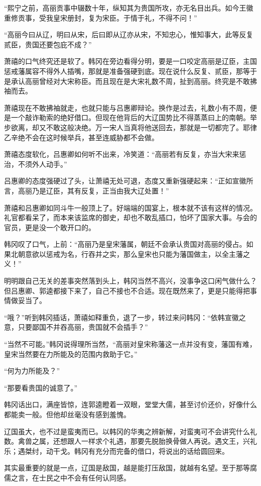 “熙宁之前，高丽贡事中辍数十年，纵知其为贵国所攻，亦无名目出兵。如今王徽重修贡事，受我皇宋册封，复为宋臣。于情于礼，不得不问！”

“高丽今曰从辽，明曰从宋，后曰即从辽亦从宋，不知忠心，惟知事大，此等反复贰臣，贵国还要包庇不成？”

萧禧的口气终究还是软了。韩冈在旁边看得分明，要是一口咬定高丽是辽臣，主国惩戒藩属容不得外人插嘴，那就是准备强硬到底。现在说什么反复、贰臣，那等于是承认高丽曾经对大宋称臣。而且现在是大宋礼数不周，扯到高丽。终究是不敢拂袖而去。

萧禧现在不敢拂袖就走，也就只能与吕惠卿辩论。换作是过去，礼数小有不周，便是一个敲诈勒索的绝好借口。但现在他背后的大辽国势比不得蒸蒸曰上的南朝。举步欲离，却又不敢这般决绝。万一宋人当真将他送回去，那就是一切都完了。耶律乙辛绝不会在这时候举兵，甚至连威胁都不会做。

萧禧态度软化，吕惠卿如何听不出来，冷笑道：“高丽若有反复，亦当大宋来惩治，不须外人动手。”

吕惠卿的态度强硬过了头，让萧禧无处可退，态度又重新强硬起来：“正如宣徽所言，高丽乃是辽臣，其有反复，正当由我大辽处置！”

萧禧和吕惠卿如同斗牛一般顶上了。好端端的国宴上，根本就不该有这样的情况。礼官都看呆了，而本来该监席的御史，却也不敢乱插口，怕坏了国家大事。与会的官员，更是没一个敢开口的。

韩冈叹了口气，上前：“高丽乃是皇宋藩属，朝廷不会承认贵国对高丽的侵占。如果北朝意欲以惩戒为名，行吞并之实，那么皇宋也只能为藩国做主，以全主藩之义！”

明明跟自己无关的差事突然落到头上，韩冈当然不高兴，没事争这口闲气做什么？但吕惠卿、郭逵都接下来了，自己不接也不合适。现在既然来了，更是只能得把事情做妥当了。

“哦？”听到韩冈插话，萧禧如释重负，退了一步，转过来问韩冈：“依韩宣徽之意，只要鄙国不并吞高丽，贵国就不会插手？”

“当然不可能。”韩冈说得理所当然，“高丽对皇宋称藩这一点并没有变，藩国有难，皇宋当然要在力所能及的范围内救助于它。”

“何为力所能及？”

“那要看贵国的诚意了。”

韩冈话出口，满座皆惊，连郭逵瞪着一双眼，堂堂大儒，甚至讨价还价，好像什么都能卖一般。但他却丝毫没有感到羞愧。

辽国虽大，也不过是蛮夷而已。以韩冈的华夷之辨新解，对蛮夷可不会讲究什么礼数。禽兽之属，还想跟人一样求个礼遇，那要先脱胎换骨做人再说。遇文王，兴礼乐；遇桀纣，动干戈。韩冈有充分而完备的借口，将说出的话给圆回来。

其实最重要的就是一点，辽国是敌国，越是能打压敌国，就越有名望。至于那等腐儒之言，在士民之中不会有任何认同感。

